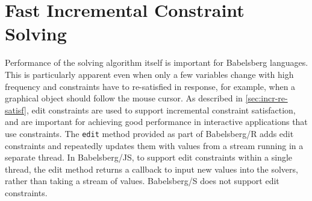 \section{Fast Incremental Constraint Solving}
\label{sec:implementing-edit-constraints}
Performance of the solving algorithm itself is important for Babelsberg
languages. This is particularly apparent even when only a few variables change
with high frequency and constraints have to re-satisfied in response, for
example, when a graphical object should follow the mouse cursor. As described in
\autoref{sec:incr-re-satisf}, edit constraints are used to support incremental
constraint satisfaction, and are important for achieving good performance in
interactive applications that use constraints.  The \lstinline{edit} method
provided as part of Babelsberg/R adds edit constraints and repeatedly updates
them with values from a stream running in a separate thread. In Babelsberg/JS,
to support edit constraints within a single thread, the edit method returns a
callback to input new values into the solvers, rather than taking a stream of
values. Babelsberg/S does not support edit constraints.

